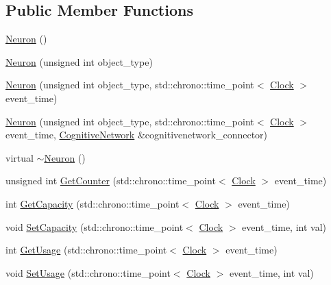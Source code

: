 \subsection*{Public Member Functions}
\begin{DoxyCompactItemize}
\item 
\mbox{\hyperlink{classNeuron_a823487d01615fadb8ac19a2768dd9d96}{Neuron}} ()
\item 
\mbox{\hyperlink{classNeuron_acbc433cac4f27aa7f4e05be26c336aa5}{Neuron}} (unsigned int object\+\_\+type)
\item 
\mbox{\hyperlink{classNeuron_a4611499895417d44250c452d0fc719a6}{Neuron}} (unsigned int object\+\_\+type, std\+::chrono\+::time\+\_\+point$<$ \mbox{\hyperlink{universe_8h_a0ef8d951d1ca5ab3cfaf7ab4c7a6fd80}{Clock}} $>$ event\+\_\+time)
\item 
\mbox{\hyperlink{classNeuron_a6839febd20fb8f776151e00142411a56}{Neuron}} (unsigned int object\+\_\+type, std\+::chrono\+::time\+\_\+point$<$ \mbox{\hyperlink{universe_8h_a0ef8d951d1ca5ab3cfaf7ab4c7a6fd80}{Clock}} $>$ event\+\_\+time, \mbox{\hyperlink{classCognitiveNetwork}{Cognitive\+Network}} \&cognitivenetwork\+\_\+connector)
\item 
virtual \mbox{\hyperlink{classNeuron_aecd41febe74ef417230cd74af0c8b801}{$\sim$\+Neuron}} ()
\item 
unsigned int \mbox{\hyperlink{classNeuron_a0b5fe55bf939808986b3697d18a834f4}{Get\+Counter}} (std\+::chrono\+::time\+\_\+point$<$ \mbox{\hyperlink{universe_8h_a0ef8d951d1ca5ab3cfaf7ab4c7a6fd80}{Clock}} $>$ event\+\_\+time)
\item 
int \mbox{\hyperlink{classNeuron_a93cce70c19c8e70accaa31908d3f29f6}{Get\+Capacity}} (std\+::chrono\+::time\+\_\+point$<$ \mbox{\hyperlink{universe_8h_a0ef8d951d1ca5ab3cfaf7ab4c7a6fd80}{Clock}} $>$ event\+\_\+time)
\item 
void \mbox{\hyperlink{classNeuron_a8f5766ea61dc46b7a25361df540755ec}{Set\+Capacity}} (std\+::chrono\+::time\+\_\+point$<$ \mbox{\hyperlink{universe_8h_a0ef8d951d1ca5ab3cfaf7ab4c7a6fd80}{Clock}} $>$ event\+\_\+time, int val)
\item 
int \mbox{\hyperlink{classNeuron_a745b090da1b8f8fc7e3cf0ca06dfb117}{Get\+Usage}} (std\+::chrono\+::time\+\_\+point$<$ \mbox{\hyperlink{universe_8h_a0ef8d951d1ca5ab3cfaf7ab4c7a6fd80}{Clock}} $>$ event\+\_\+time)
\item 
void \mbox{\hyperlink{classNeuron_abf99856ac41b5c9c4948b3204bbc1590}{Set\+Usage}} (std\+::chrono\+::time\+\_\+point$<$ \mbox{\hyperlink{universe_8h_a0ef8d951d1ca5ab3cfaf7ab4c7a6fd80}{Clock}} $>$ event\+\_\+time, int val)

\end{DoxyCompactItemize}
